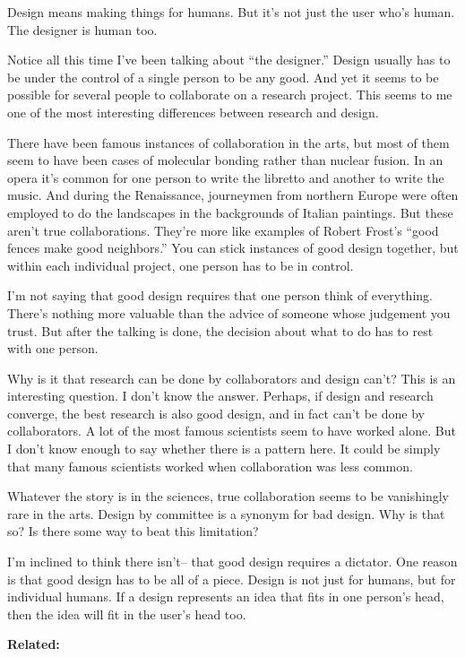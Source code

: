 Design means making things for humans. But it's not just the user who's
human. The designer is human too.

Notice all this time I've been talking about ``the designer.'' Design
usually has to be under the control of a single person to be any good.
And yet it seems to be possible for several people to collaborate on a
research project. This seems to me one of the most interesting
differences between research and design.

There have been famous instances of collaboration in the arts, but most
of them seem to have been cases of molecular bonding rather than nuclear
fusion. In an opera it's common for one person to write the libretto and
another to write the music. And during the Renaissance, journeymen from
northern Europe were often employed to do the landscapes in the
backgrounds of Italian paintings. But these aren't true collaborations.
They're more like examples of Robert Frost's ``good fences make good
neighbors.'' You can stick instances of good design together, but within
each individual project, one person has to be in control.

I'm not saying that good design requires that one person think of
everything. There's nothing more valuable than the advice of someone
whose judgement you trust. But after the talking is done, the decision
about what to do has to rest with one person.

Why is it that research can be done by collaborators and design can't?
This is an interesting question. I don't know the answer. Perhaps, if
design and research converge, the best research is also good design, and
in fact can't be done by collaborators. A lot of the most famous
scientists seem to have worked alone. But I don't know enough to say
whether there is a pattern here. It could be simply that many famous
scientists worked when collaboration was less common.

Whatever the story is in the sciences, true collaboration seems to be
vanishingly rare in the arts. Design by committee is a synonym for bad
design. Why is that so? Is there some way to beat this limitation?

I'm inclined to think there isn't-- that good design requires a
dictator. One reason is that good design has to be all of a piece.
Design is not just for humans, but for individual humans. If a design
represents an idea that fits in one person's head, then the idea will
fit in the user's head too.

\textbf{Related:}
